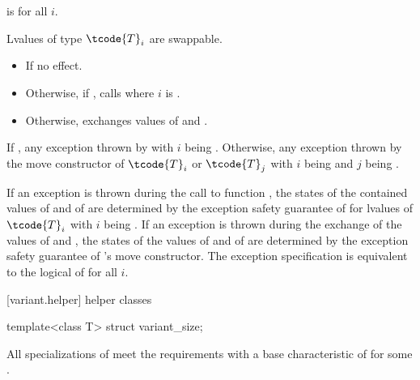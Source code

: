 \begin{itemdescr}
\pnum
\mandates
{} is  for all $i$.

\pnum
\expects
Lvalues of type $\tcode{T}_i$ are swappable.

\pnum
\effects
\begin{itemize}
\item
If  no effect.
\item
Otherwise, if , calls  where $i$ is .
\item
Otherwise, exchanges values of  and .
\end{itemize}

\pnum
\throws
If ,
any exception thrown by 
with $i$ being .
Otherwise, any exception thrown by the move constructor
of $\tcode{T}_i$ or $\tcode{T}_j$
with $i$ being  and $j$ being .

\pnum
\remarks
If an exception is thrown during the call to function ,
the states of the contained values of  and of  are
determined by the exception safety guarantee of  for lvalues of
$\tcode{T}_i$ with $i$ being .
If an exception is thrown during the exchange of the values of 
and , the states of the values of  and of 
are determined by the exception safety guarantee of 's move constructor.
The exception specification is equivalent to the logical  of
 for all $i$.
\end{itemdescr}

[variant.helper]{ helper classes}

%
\begin{itemdecl}
template<class T> struct variant_size;
\end{itemdecl}

\begin{itemdescr}
\pnum
All specializations of  meet the
 requirements
with a base characteristic of  for some .
\end{itemdescr}

